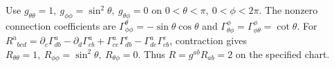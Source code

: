 Use \(g_{\theta\theta}=1,\ g_{\phi\phi}=\sin^2\theta,\ g_{\theta\phi}=0\)
on \(0<\theta<\pi,\ 0<\phi<2\pi\). The nonzero connection coefficients
are \(\Gamma^\theta_{\phi\phi}=-\sin\theta\cos\theta\) and
\(\Gamma^\phi_{\theta\phi}=\Gamma^\phi_{\phi\theta}=\cot\theta\).
For \(R^a{}_{bcd}=\partial_c\Gamma^a_{db}-\partial_d\Gamma^a_{cb}
+\Gamma^a_{ce}\Gamma^e_{db}-\Gamma^a_{de}\Gamma^e_{cb}\), contraction gives
\(R_{\theta\theta}=1,\ R_{\phi\phi}=\sin^2\theta,\ R_{\theta\phi}=0\).
Thus \(R=g^{ab}R_{ab}=2\) on the specified chart.
